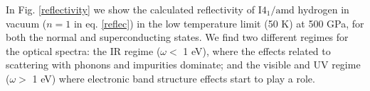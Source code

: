\documentclass[%
 reprint,
superscriptaddress,
 amsmath,amssymb,
 aps,
prb,
floatfix,
]{revtex4-1}
\begin{document}
 











 




In Fig. \ref{reflectivity} we show the calculated reflectivity of $\mathrm{I4_1/amd}$ 
hydrogen in vacuum ($n=1$ in eq. \eqref{reflec}) in the low temperature limit (50 K) %
at 500 GPa, 
for both the normal and superconducting states. We find two different regimes 
for the optical spectra: the IR regime ($\omega<$ 1 eV), where the effects related to 
scattering with phonons and impurities dominate;
and the visible and UV regime ($\omega>$ 1 eV) where
electronic band structure effects start to play a role. 
\end{document}
